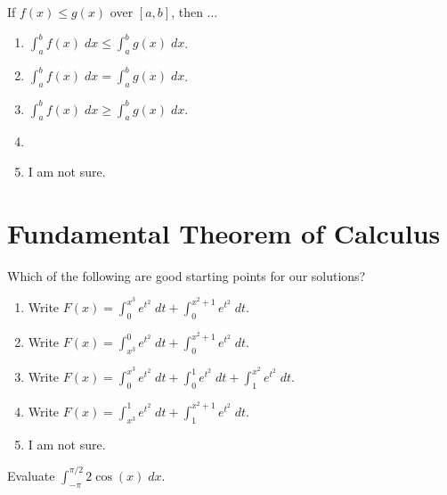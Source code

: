 \documentclass[14pt]{beamer}
\begin{document}
\begin{frame}[t]
  If \(f(x) \le g(x)\) over \([a,b]\), then ...

  \begin{enumerate} \setlength\itemsep{1ex}
    \item \(\int_{a}^{b} f(x) \;dx \le \int_{a}^{b} g(x) \;dx\).
    \item \(\int_{a}^{b} f(x) \;dx = \int_{a}^{b} g(x) \;dx\).
    \item \(\int_{a}^{b} f(x) \;dx \ge \int_{a}^{b} g(x) \;dx\).
    \item 
    \item I am not sure.
  \end{enumerate} 
\end{frame}

\section{Fundamental Theorem of Calculus}
\begin{frame}[t]
  Which of the following are good starting points for our solutions?

  \begin{enumerate} \setlength\itemsep{1ex}
    \item Write \(F(x) = \int_{0}^{x^{3}} e^{t^{2}} \;dt + \int_{0}^{x^{2}+1} e^{t^{2}} \;dt \).
    \item Write \(F(x) = \int_{x^{3}}^{0} e^{t^{2}} \;dt + \int_{0}^{x^{2}+1} e^{t^{2}} \;dt \).
    \item Write \(F(x) = \int_{0}^{x^{3}} e^{t^{2}} \;dt + \int_{0}^{1} e^{t^{2}} \;dt + \int_{1}^{x^{2}} e^{t^{2}} \;dt\).
    \item Write \(F(x) = \int_{x^{3}}^{1} e^{t^{2}} \;dt + \int_{1}^{x^{2}+1} e^{t^{2}} \;dt \).
    \item I am not sure.
  \end{enumerate}
\end{frame}

\begin{frame}
  Evaluate \(\int_{-\pi}^{\pi/2} 2 \cos(x) \;dx\).
\end{frame}
\end{document}
